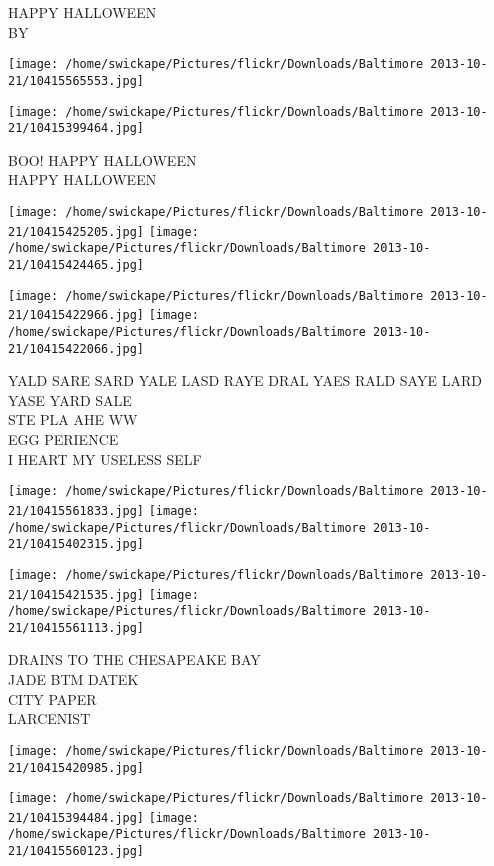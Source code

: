 \documentclass[10pt,letterpaper]{article}
\begin{document}
HAPPY HALLOWEEN\\
BY\\
\pagebreak

\texttt{[image: /home/swickape/Pictures/flickr/Downloads/Baltimore 2013-10-21/10415565553.jpg]}

\vspace{0.25in}
\texttt{[image: /home/swickape/Pictures/flickr/Downloads/Baltimore 2013-10-21/10415399464.jpg]}

BOO! HAPPY HALLOWEEN\\
HAPPY HALLOWEEN\\
\pagebreak

\texttt{[image: /home/swickape/Pictures/flickr/Downloads/Baltimore 2013-10-21/10415425205.jpg]}
\texttt{[image: /home/swickape/Pictures/flickr/Downloads/Baltimore 2013-10-21/10415424465.jpg]}

\texttt{[image: /home/swickape/Pictures/flickr/Downloads/Baltimore 2013-10-21/10415422966.jpg]}
\texttt{[image: /home/swickape/Pictures/flickr/Downloads/Baltimore 2013-10-21/10415422066.jpg]}

YALD SARE SARD YALE LASD RAYE DRAL YAES RALD SAYE LARD YASE YARD SALE\\
STE PLA AHE WW\\
EGG PERIENCE\\
I HEART MY USELESS SELF\\
\pagebreak

\texttt{[image: /home/swickape/Pictures/flickr/Downloads/Baltimore 2013-10-21/10415561833.jpg]}
\texttt{[image: /home/swickape/Pictures/flickr/Downloads/Baltimore 2013-10-21/10415402315.jpg]}

\texttt{[image: /home/swickape/Pictures/flickr/Downloads/Baltimore 2013-10-21/10415421535.jpg]}
\texttt{[image: /home/swickape/Pictures/flickr/Downloads/Baltimore 2013-10-21/10415561113.jpg]}

DRAINS TO THE CHESAPEAKE BAY\\
JADE BTM DATEK\\
CITY PAPER\\
LARCENIST\\
\pagebreak

\texttt{[image: /home/swickape/Pictures/flickr/Downloads/Baltimore 2013-10-21/10415420985.jpg]}

\vspace{0.25in}
\texttt{[image: /home/swickape/Pictures/flickr/Downloads/Baltimore 2013-10-21/10415394484.jpg]}
\texttt{[image: /home/swickape/Pictures/flickr/Downloads/Baltimore 2013-10-21/10415560123.jpg]}
\end{document}
